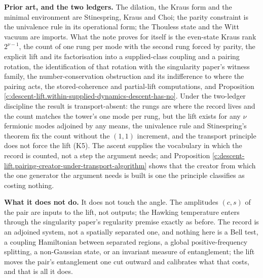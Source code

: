 \documentclass[11pt]{article}
\theoremstyle{definition}
\theoremstyle{plain}
\begin{document}
\label{c:note.descent-lift.setting-what-does-two-papers-what-5}
\textbf{Prior art, and the two ledgers.} The dilation, the Kraus form and the minimal environment are Stinespring, Kraus and Choi; the parity constraint is the univalence rule in its operational form; the Thouless state and the Witt vacuum are imports. What the note proves for itself is the even-state Kraus rank $2^{\nu-1}$, the count of one rung per mode with the second rung forced by parity, the explicit lift and its factorisation into a supplied-class coupling and a pairing rotation, the identification of that rotation with the singularity paper's witness family, the number-conservation obstruction and its indifference to where the pairing acts, the stored-coherence and partial-lift computations, and Proposition \ref{c:descent-lift.within-supplied-dynamics-descent-has-no}. Under the two-ledger discipline the result is transport-absent: the rungs are where the record lives and the count matches the tower's one mode per rung, but the lift exists for any $\nu$ fermionic modes adjoined by any means, the univalence rule and Stinespring's theorem fix the count without the $(1,1)$ increment, and the transport principle does not force the lift (K5). The ascent supplies the vocabulary in which the record is counted, not a step the argument needs; and Proposition \ref{c:descent-lift.pairing-creator-under-transport-algorithm} shows that the creator from which the one generator the argument needs is built is one the principle classifies as costing nothing.

\label{c:note.descent-lift.setting-what-does-two-papers-what-6}
\textbf{What it does not do.} It does not touch the angle. The amplitudes $(c, s)$ of the pair are inputs to the lift, not outputs; the Hawking temperature enters through the singularity paper's regularity premise exactly as before. The record is an adjoined system, not a spatially separated one, and nothing here is a Bell test, a coupling Hamiltonian between separated regions, a global positive-frequency splitting, a non-Gaussian state, or an invariant measure of entanglement; the lift moves the pair's entanglement one cut outward and calibrates what that costs, and that is all it does.
\end{document}
